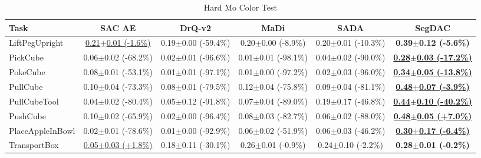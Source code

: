 \begin{table}[htbp]
\centering
\scriptsize
\caption{Hard Mo Color Test}
\label{tab:appendix_mocolortest_hard}
\begin{adjustbox}{max width=\textwidth}
\begin{tabular}{l*{5}{c}}
\toprule
\textbf{Task} & \textbf{SAC AE} & \textbf{DrQ-v2} & \textbf{MaDi} & \textbf{SADA} & \textbf{SegDAC} \\
\midrule
LiftPegUpright & \underline{0.21$\pm$0.01 \scriptsize{(-1.6\%)}} & 0.19$\pm$0.00 \scriptsize{(-59.4\%)} & 0.20$\pm$0.00 \scriptsize{(-8.9\%)} & 0.20$\pm$0.01 \scriptsize{(-10.3\%)} & \textbf{0.39$\pm$0.12 \scriptsize{(-5.6\%)}} \\
PickCube & 0.06$\pm$0.02 \scriptsize{(-68.2\%)} & 0.02$\pm$0.01 \scriptsize{(-96.6\%)} & 0.01$\pm$0.01 \scriptsize{(-98.1\%)} & 0.04$\pm$0.02 \scriptsize{(-90.0\%)} & \textbf{\underline{0.28$\pm$0.03 \scriptsize{(-17.2\%)}}} \\
PokeCube & 0.08$\pm$0.01 \scriptsize{(-53.1\%)} & 0.01$\pm$0.01 \scriptsize{(-97.1\%)} & 0.01$\pm$0.00 \scriptsize{(-97.2\%)} & 0.02$\pm$0.03 \scriptsize{(-96.0\%)} & \textbf{\underline{0.34$\pm$0.05 \scriptsize{(-13.8\%)}}} \\
PullCube & 0.10$\pm$0.04 \scriptsize{(-73.3\%)} & 0.08$\pm$0.01 \scriptsize{(-79.5\%)} & 0.12$\pm$0.04 \scriptsize{(-75.8\%)} & 0.09$\pm$0.04 \scriptsize{(-81.1\%)} & \textbf{\underline{0.48$\pm$0.07 \scriptsize{(-3.9\%)}}} \\
PullCubeTool & 0.04$\pm$0.02 \scriptsize{(-80.4\%)} & 0.05$\pm$0.12 \scriptsize{(-91.8\%)} & 0.07$\pm$0.04 \scriptsize{(-89.0\%)} & 0.19$\pm$0.17 \scriptsize{(-46.8\%)} & \textbf{\underline{0.44$\pm$0.10 \scriptsize{(-40.2\%)}}} \\
PushCube & 0.10$\pm$0.02 \scriptsize{(-65.9\%)} & 0.02$\pm$0.00 \scriptsize{(-96.4\%)} & 0.08$\pm$0.03 \scriptsize{(-82.7\%)} & 0.06$\pm$0.02 \scriptsize{(-88.0\%)} & \textbf{\underline{0.48$\pm$0.05 \scriptsize{(+7.0\%)}}} \\
PlaceAppleInBowl & 0.02$\pm$0.01 \scriptsize{(-78.6\%)} & 0.01$\pm$0.00 \scriptsize{(-92.9\%)} & 0.06$\pm$0.02 \scriptsize{(-51.9\%)} & 0.06$\pm$0.03 \scriptsize{(-46.2\%)} & \textbf{\underline{0.30$\pm$0.17 \scriptsize{(-6.4\%)}}} \\
TransportBox & \underline{0.05$\pm$0.03 \scriptsize{(+1.8\%)}} & 0.18$\pm$0.11 \scriptsize{(-30.1\%)} & 0.26$\pm$0.01 \scriptsize{(-0.9\%)} & 0.24$\pm$0.10 \scriptsize{(-2.2\%)} & \textbf{0.28$\pm$0.01 \scriptsize{(-0.2\%)}} \\
\bottomrule
\end{tabular}
\end{adjustbox}
\end{table}

